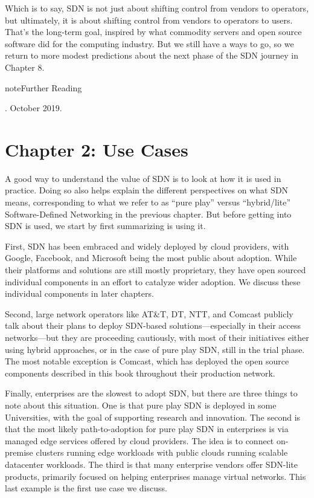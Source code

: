 \documentclass[letterpaper,11pt,english]{sphinxmanual}
\begin{document}
Which is to say, SDN is not just about shifting control from vendors
to operators, but ultimately, it is about shifting control from
vendors to operators to users. That’s the long-term goal, inspired by
what commodity servers and open source software did for the computing
industry. But we still have a ways to go, so we return to more modest
predictions about the next phase of the SDN journey in Chapter 8.

\label{\detokenize{intro:reading-future}}
\begin{sphinxadmonition}{note}{Further Reading}

.
October 2019.
\end{sphinxadmonition}


\chapter{Chapter 2:  Use Cases}
\label{\detokenize{uses:chapter-2-use-cases}}\label{\detokenize{uses::doc}}
A good way to understand the value of SDN is to look at how it is used
in practice.  Doing so also helps explain the different perspectives
on what SDN means, corresponding to what we refer to as “pure play”
versus “hybrid/lite” Software-Defined Networking in the previous
chapter. But before getting into  SDN is used, we start by first
summarizing  is using it.

First, SDN has been embraced and widely deployed by cloud providers,
with Google, Facebook, and Microsoft being the most public about
adoption. While their platforms and solutions are still mostly
proprietary, they have open sourced individual components in an effort
to catalyze wider adoption. We discuss these individual components in
later chapters.

Second, large network operators like AT\&T, DT, NTT, and Comcast
publicly talk about their plans to deploy SDN-based
solutions—especially in their access networks—but they are proceeding
cautiously, with most of their initiatives either using hybrid
approaches, or in the case of pure play SDN, still in the trial
phase. The most notable exception is Comcast, which has deployed the
open source components described in this book throughout their
production network.

Finally, enterprises are the slowest to adopt SDN, but there are three
things to note about this situation. One is that pure play SDN is
deployed in some Universities, with the goal of supporting research
and innovation. The second is that the most likely path-to-adoption
for pure play SDN in enterprises is via managed edge services offered
by cloud providers. The idea is to connect on-premise clusters running
edge workloads with public clouds running scalable datacenter
workloads. The third is that many enterprise vendors offer SDN-lite
products, primarily focused on helping enterprises manage virtual
networks. This last example is the first use case we discuss.
\end{document}
